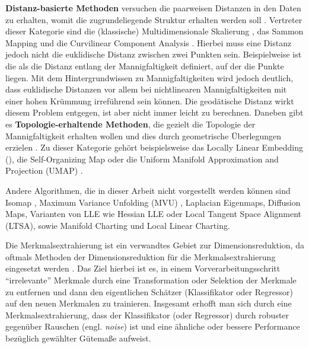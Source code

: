 \textbf{Distanz-basierte Methoden} versuchen die paarweisen Distanzen in den Daten zu erhalten, womit die zugrundeliegende Struktur erhalten werden soll \parencite[3]{Gracia.2014}. Vertreter dieser Kategorie sind die (klassische) Multidimensionale
Skalierung \parencites{Kruskal.1964}{Cox.2008}, das Sammon Mapping \addref und die Curvilinear Component Analysis
\addref. Hierbei muss eine Distanz jedoch nicht die euklidische Distanz zwischen zwei Punkten sein.
Beispielweise ist die  als die Distanz entlang der Mannigfaltigkeit
definiert, auf der die Punkte liegen. Mit dem Hintergrundwissen zu Mannigfaltigkeiten wird jedoch
deutlich, dass euklidische Distanzen vor allem bei nichtlinearen Mannigfaltigkeiten mit einer hohen
Krümmung irreführend sein können. Die geodätische Distanz wirkt diesem Problem entgegen, ist aber
nicht immer leicht zu berechnen. Daneben gibt es \textbf{Topologie-erhaltende Methoden}, die
gezielt die Topologie der Mannigfaltigkeit erhalten wollen und dies durch geometrische Überlegungen
erzielen \parencite[4]{Gracia.2014}. Zu dieser Kategorie gehört beispielsweise das Locally Linear Embedding
(), die Self-Organizing Map \parencite{Kohonen.1990} oder die Uniform Manifold Approximation and Projection (UMAP) \parencite{McInnes.2018}.

Andere Algorithmen, die in dieser Arbeit nicht vorgestellt werden können sind Isomap \parencite{Tenenbaum.2000}, Maximum Variance Unfolding (MVU) \parencite{Weinberger.2006}, Laplacian Eigenmaps, Diffusion Maps, Varianten von LLE wie Hessian LLE
oder Local Tangent Space Alignment (LTSA), sowie Manifold Charting und Local Linear
Charting.\addref

Die Merkmalsextrahierung ist ein verwandtes Gebiet zur Dimensionsreduktion, da oftmals Methoden der
Dimensionsreduktion für die Merkmalsextrahierung eingesetzt werden \parencite[3]{Guyon.2006b}. Das Ziel hierbei ist es, in einem Vorverarbeitungsschritt
\enquote{irrelevante} Merkmale durch eine Transformation oder Selektion der Merkmale zu entfernen
und dann den eigentlichen Schätzer (Klassifikator oder Regressor) auf den neuen Merkmalen zu
trainieren. Insgesamt erhofft man sich durch eine Merkmalsextrahierung, dass der Klassifikator
(oder Regressor) durch robuster gegenüber Rauschen (engl. \textit{noise}) ist und eine ähnliche
oder bessere Performance bezüglich gewählter Gütemaße aufweist.

